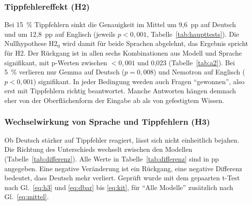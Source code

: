 \documentclass[a4paper,titlepage]{article}
\numberwithin{equation}{section} %
\begin{document}
\subsubsection{Tippfehlereffekt (H2)}\label{sec:h2}

Bei 15~\% Tippfehlern sinkt die Genauigkeit im Mittel um 9,6~pp auf Deutsch und um 12,8~pp auf Englisch (jeweils $p < 0{,}001$, Tabelle~\ref{tab:haupttests}). Die Nullhypothese H2$_0$ wird damit für beide Sprachen abgelehnt, das Ergebnis spricht für H2. Der Rückgang ist in allen sechs Kombinationen aus Modell und Sprache signifikant, mit p-Werten zwischen $< 0{,}001$ und 0,023 (Tabelle~\ref{tab:a2}). Bei 5~\% verlieren nur Gemma auf Deutsch ($p = 0{,}008$) und Nemotron auf Englisch ($p < 0{,}001$) signifikant. In jeder Bedingung werden auch Fragen "`gewonnen"', also erst mit Tippfehlern richtig beantwortet. Manche Antworten hängen demnach eher von der Oberflächenform der Eingabe ab als von gefestigtem Wissen.

\subsubsection{Wechselwirkung von Sprache und Tippfehlern (H3)}\label{sec:h3}

Ob Deutsch stärker auf Tippfehler reagiert, lässt sich nicht einheitlich bejahen. Die Richtung des Unterschieds wechselt zwischen den Modellen (Tabelle~\ref{tab:differenz}). Alle Werte in Tabelle~\ref{tab:differenz} sind in pp angegeben. Eine negative Veränderung ist ein Rückgang, eine negative Differenz bedeutet, dass Deutsch mehr verliert. Geprüft wurde mit dem gepaarten t-Test nach Gl.~\eqref{eq:h3} und \eqref{eq:dbar} bis \eqref{eq:kit}, für "`Alle Modelle"' zusätzlich nach Gl.~\eqref{eq:mittel}.
\end{document}
